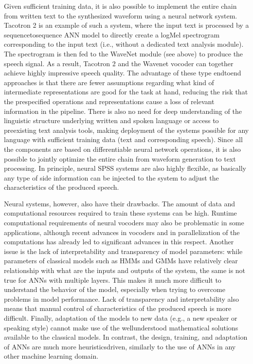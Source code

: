 \documentclass[letterpaper,10pt,english]{jupyterBook}
\begin{document}
\sphinxAtStartPar
Given sufficient training data, it is also possible to implement the
entire chain from written text to the synthesized waveform using a
neural network system. Tacotron 2 is an example of such a system, where
the input text is processed by a sequence\sphinxhyphen{}to\sphinxhyphen{}sequence ANN model to
directly create a log\sphinxhyphen{}Mel spectrogram corresponding to the input text
(i.e., without a dedicated text analysis module). The spectrogram is
then fed to the WaveNet module (see above) to produce the speech signal.
As a result, Tacotron 2 and the Wavenet vocoder can together achieve
highly impressive speech quality. The advantage of these type end\sphinxhyphen{}to\sphinxhyphen{}end
approaches is that there are fewer assumptions regarding what kind of
intermediate representations are good for the task at hand, reducing the
risk that the pre\sphinxhyphen{}specified operations and representations cause a loss
of relevant information in the pipeline. There is also no need for deep
understanding of the linguistic structure underlying written and spoken
language or access to pre\sphinxhyphen{}existing text analysis tools, making
deployment of the systems possible for any language with sufficient
training data (text and corresponding speech). Since all the components
are based on differentiable neural network operations, it is also
possible to jointly optimize the entire chain from waveform generation
to text processing. In principle, neural SPSS systems are also highly
flexible, as basically any type of side information can be injected to
the system to adjust the characteristics of the produced speech.

\sphinxAtStartPar
Neural systems, however, also have their drawbacks. The amount of data
and computational resources required to train these systems can be high.
Runtime computational requirements of neural vocoders may also be
problematic in some applications, although recent advances in vocoders
and in parallelization of the computations has already led to
significant advances in this respect. Another issue is the lack of
interpretability and transparency of model parameters: while parameters
of classical models such as HMMs and GMMs have relatively clear
relationship with what are the inputs and outputs of the system, the
same is not true for ANNs with multiple layers. This makes it much more
difficult to understand the behavior of the model, especially when
trying to overcome problems in model performance. Lack of transparency
and interpretability also means that manual control of characteristics
of the produced speech is more difficult. Finally, adaptation of the
models to new data (e.g., a new speaker or speaking style) cannot make
use of the well\sphinxhyphen{}understood mathematical solutions available to the
classical models. In contrast, the design, training, and adaptation of
ANNs are much more heuristics\sphinxhyphen{}driven, similarly to the use of ANNs in
any other machine learning domain.
\end{document}

